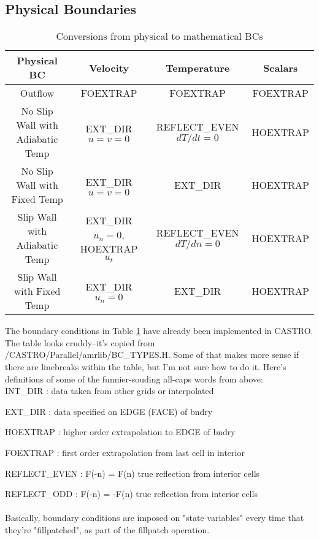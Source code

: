 \subsection{Physical Boundaries}
\begin{table}[h]
\begin{scriptsize}
\begin{center}
\begin{tabular}{|c|c|c|c|} \hline
Physical BC & Velocity & Temperature & Scalars \\
\hline
Outflow & FOEXTRAP & FOEXTRAP & FOEXTRAP \\
No Slip Wall with Adiabatic Temp & EXT\_DIR $u=v=0$ & REFLECT\_EVEN $dT/dt=0$ & HOEXTRAP \\
No Slip Wall with Fixed Temp & EXT\_DIR $u=v=0$ & EXT\_DIR & HOEXTRAP \\
Slip Wall with Adiabatic Temp & EXT\_DIR $u_n=0$, HOEXTRAP $u_t$ & REFLECT\_EVEN $dT/dn=0$ & HOEXTRAP \\
Slip Wall with Fixed Temp & EXT\_DIR $u_n=0$ & EXT\_DIR & HOEXTRAP \\
\hline
\end{tabular}
\end{center}
\caption{Conversions from physical to mathematical BCs}
\label{Table:BC}
\end{scriptsize}
\end{table}
The boundary conditions in Table \ref{Table:BC} have already been implemented in CASTRO.  The table looks cruddy--it's copied from /CASTRO/Parallel/amrlib/BC\_TYPES.H. Some of that makes more sense if there are linebreaks within the table, but I'm not sure how to do it. Here's definitions of some of the funnier-souding all-caps words from above:\\

INT\_DIR  : data taken from other grids or interpolated

EXT\_DIR  : data specified on EDGE (FACE) of bndry

HOEXTRAP  : higher order extrapolation to EDGE of bndry

FOEXTRAP  : first order extrapolation from last cell in interior

REFLECT\_EVEN : F(-n) = F(n) true reflection from interior cells

REFLECT\_ODD  : F(-n) = -F(n) true reflection from interior cells\\ \\
Basically, boundary conditions are imposed on "state variables" every time that they're "fillpatched", as part of the fillpatch operation.

